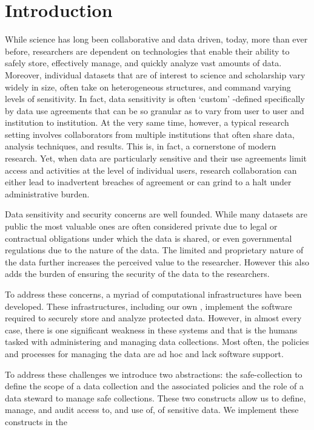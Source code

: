 \section{Introduction}



While science has long been collaborative and data driven, today, more than ever before, 
researchers are dependent on technologies that enable their ability to safely store, 
effectively manage, and quickly analyze vast amounts of
data. Moreover, individual datasets that are of interest to science and scholarship 
vary widely in size, often take on heterogeneous structures, and command varying 
levels of sensitivity. In fact, data sensitivity is often `custom' -defined specifically by
data use agreements that can be so granular as to vary from user to user and institution 
to institution. At the very same time, however, a typical research setting involves 
collaborators from multiple institutions that often share data, analysis techniques, 
and results. This is, in fact, a cornerstone of modern research. Yet, when data are 
particularly sensitive and their use agreements limit access and activities at the 
level of individual users, research collaboration can either lead to inadvertent 
breaches of agreement or can grind to a halt under administrative burden.



Data sensitivity and security concerns are well founded. While many datasets are public the most
valuable ones are often considered private due to legal or contractual obligations under which the data
is shared, or even governmental regulations due to the nature of the data. The limited and proprietary nature
of the data further increases the perceived value to the researcher. However this also adds the burden of
ensuring the security of the data to the researchers.

To address these concerns, a myriad of computational infrastructures
have been developed. These infrastructures, including our own \NAMENS, 
implement the software required to securely store and analyze protected
data. However, in almost every case, there is one significant weakness in these systems
and that is the humans tasked with administering and managing 
data collections. Most often, the policies and processes for managing
the data are ad hoc and lack software support. 

To address these challenges we introduce two abstractions: 
the safe-collection to define the scope of a data collection
and the associated policies and the role of a data steward
to manage safe collections.  These two constructs allow us 
to define, manage, and audit access to, and use of, of 
sensitive data.  We implement these constructs in the 


